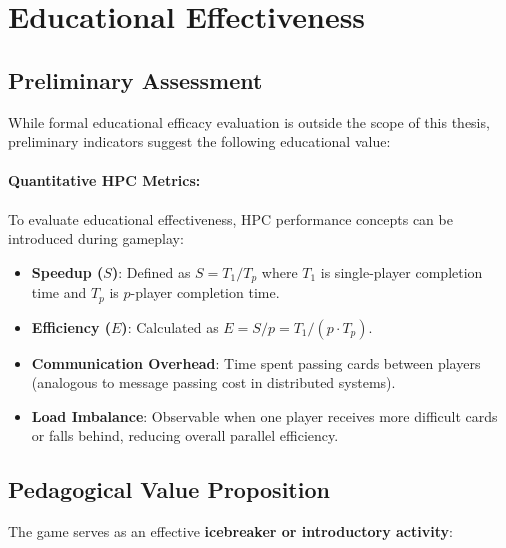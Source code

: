 \section{Educational Effectiveness}
\label{sec:educational-effectiveness}

\subsection{Preliminary Assessment}
\label{subsec:preliminary-assessment}

While formal educational efficacy evaluation is outside the scope of this thesis, preliminary indicators suggest the following educational value:

\paragraph*{Quantitative HPC Metrics:}

To evaluate educational effectiveness, HPC performance concepts can be introduced during gameplay:

\begin{itemize}
    \item \textbf{Speedup ($S$)}: Defined as $S = T_1 / T_p$ where $T_1$ is single-player completion time and $T_p$ is $p$-player completion time.
    \item \textbf{Efficiency ($E$)}: Calculated as $E = S / p = T_1 / (p \cdot T_p)$.
    \item \textbf{Communication Overhead}: Time spent passing cards between players (analogous to message passing cost in distributed systems).
    \item \textbf{Load Imbalance}: Observable when one player receives more difficult cards or falls behind, reducing overall parallel efficiency.
\end{itemize}



\subsection{Pedagogical Value Proposition}
\label{subsec:pedagogical-value}

The game serves as an effective \textbf{icebreaker or introductory activity}:

